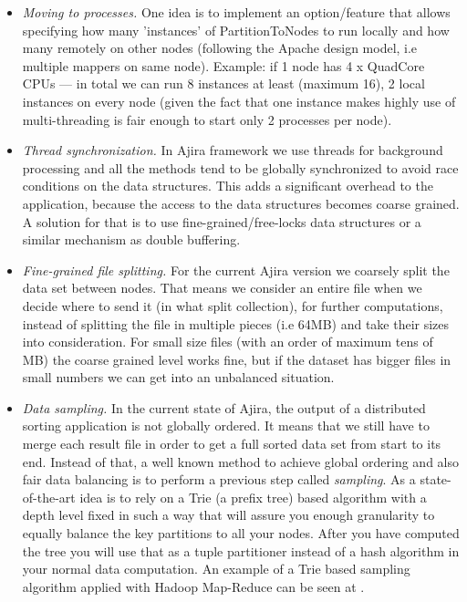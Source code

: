 \begin{itemize}
	\item \textit{Moving to processes.} One idea is to implement an option/feature that allows specifying how many 'instances' of PartitionToNodes to run locally and how many remotely on other nodes (following the Apache design model, i.e multiple mappers on same node). Example: if 1 node has 4 x QuadCore CPUs --- in total we can run 8 instances at least (maximum 16), 2 local instances on every node (given the fact that one instance makes highly use of multi-threading is fair enough to start only 2 processes per node).
	\item \textit{Thread synchronization.} In Ajira framework we use threads for background processing and all the methods tend to be globally synchronized to avoid race conditions on the data structures. This adds a significant overhead to the application, because the access to the data structures becomes coarse grained. A solution for that is to use fine-grained/free-locks data structures or a similar mechanism as double buffering. 
	\item \textit{Fine-grained file splitting.} For the current Ajira version we coarsely split the data set between nodes. That means we consider an entire file when we decide where to send it (in what split collection), for further computations, instead of splitting the file in multiple pieces (i.e 64MB) and take their sizes into consideration. For small size files (with an order of maximum tens of MB) the coarse grained level works fine, but if the dataset has bigger files in small numbers we can get into an unbalanced situation.
	\item \textit{Data sampling.} In the current state of Ajira, the output of a distributed sorting application is not globally ordered. It means that we still have to merge each result file in order to get a full sorted data set from start to its end. Instead of that, a well known method to achieve global ordering and also fair data balancing is to perform a previous step called \textit{sampling}. As a state-of-the-art idea is to rely on a Trie (a prefix tree) based algorithm with a depth level fixed in such a way that will assure you enough granularity to equally balance the key partitions to all your nodes. After you have computed the tree you will use that as a tuple partitioner instead of a hash algorithm in your normal data computation. An example of a Trie based sampling algorithm applied with Hadoop Map-Reduce can be seen at \cite{terasort}.
\end{itemize}

